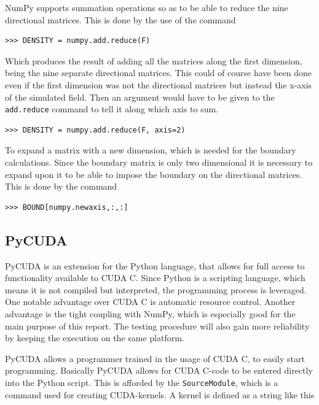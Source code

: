 NumPy supports summation operations so as to be able to reduce the nine directional matrices. This is done by the use of the command

\begin{verbatim}
>>> DENSITY = numpy.add.reduce(F)
\end{verbatim}

Which produces the result of adding all the matrices along the first dimension, being the nine separate directional matrices. This could of course have been done even if the first dimension was not the directional matrices but instead the x-axis of the simulated field. Then an argument would have to be given to the \texttt{add.reduce} command to tell it along which axis to sum.

\begin{verbatim}
>>> DENSITY = numpy.add.reduce(F, axis=2)
\end{verbatim}

To expand a matrix with a new dimension, which is needed for the boundary calculations. Since the boundary matrix is only two dimensional it is necessary to expand upon it to be able to impose the boundary on the directional matrices. This is done by the command

\begin{verbatim}
>>> BOUND[numpy.newaxis,:,:]
\end{verbatim}



\subsection{PyCUDA}


PyCUDA is an extension for the Python language, that allows for full access to functionality available to CUDA C. Since Python is a scripting language, which means it is not compiled but interpreted, the programming process is leveraged. One notable advantage over CUDA C is automatic resource control. Another advantage is the tight coupling with NumPy, which is especially good for the main purpose of this report. The testing procedure will also gain more reliability by keeping the execution on the same platform.

PyCUDA allows a programmer trained in the usage of CUDA C, to easily start programming. Basically PyCUDA allows for CUDA C-code to be entered directly into the Python script. This is afforded by the \texttt{SourceModule}, which is a command used for creating CUDA-kernels. A kernel is defined as a string like this

